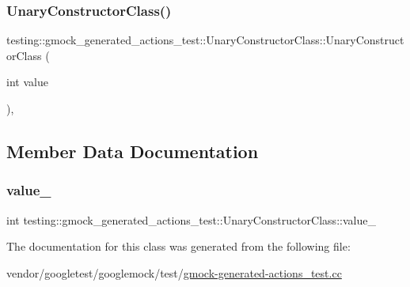 \subsubsection{\texorpdfstring{Unary\+Constructor\+Class()}{UnaryConstructorClass()}}
{\footnotesize\ttfamily testing\+::gmock\+\_\+generated\+\_\+actions\+\_\+test\+::\+Unary\+Constructor\+Class\+::\+Unary\+Constructor\+Class (\begin{DoxyParamCaption}\item[{int}]{value }\end{DoxyParamCaption})\hspace{0.3cm}{\ttfamily [inline]}, {\ttfamily [explicit]}}



\subsection{Member Data Documentation}
\mbox{\label{classtesting_1_1gmock__generated__actions__test_1_1_unary_constructor_class_a5e96ce337c5eb7016eba2ea66ae46851}} 
\subsubsection{\texorpdfstring{value\+\_\+}{value\_}}
{\footnotesize\ttfamily int testing\+::gmock\+\_\+generated\+\_\+actions\+\_\+test\+::\+Unary\+Constructor\+Class\+::value\+\_\+}



The documentation for this class was generated from the following file\+:\begin{DoxyCompactItemize}
\item 
vendor/googletest/googlemock/test/\hyperlink{gmock-generated-actions__test_8cc}{gmock-\/generated-\/actions\+\_\+test.\+cc}\end{DoxyCompactItemize}
